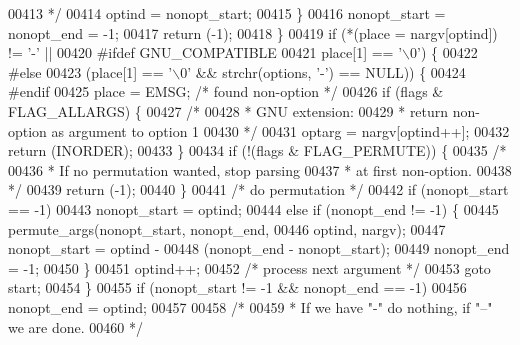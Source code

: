 \begin{DoxyCode}
{{{{{{{{{{{00413 \textcolor{comment}{                 */}
00414                 optind = nonopt\_start;
00415             \}
00416             nonopt\_start = nonopt\_end = -1;
00417             \textcolor{keywordflow}{return} (-1);
00418         \}
00419         \textcolor{keywordflow}{if} (*(place = nargv[optind]) != \textcolor{charliteral}{'-'} ||
00420 #ifdef GNU\_COMPATIBLE
00421             place[1] == \textcolor{charliteral}{'\(\backslash\)0'}) \{
00422 \textcolor{preprocessor}{#else}
00423             (place[1] == \textcolor{charliteral}{'\(\backslash\)0'} && strchr(options, \textcolor{charliteral}{'-'}) == NULL)) \{
00424 \textcolor{preprocessor}{#endif}
00425             place = EMSG;       \textcolor{comment}{/* found non-option */}
00426             \textcolor{keywordflow}{if} (flags & FLAG\_ALLARGS) \{
00427                 \textcolor{comment}{/*}
00428 \textcolor{comment}{                 * GNU extension:}
00429 \textcolor{comment}{                 * return non-option as argument to option 1}
00430 \textcolor{comment}{                 */}
00431                 optarg = nargv[optind++];
00432                 \textcolor{keywordflow}{return} (INORDER);
00433             \}
00434             \textcolor{keywordflow}{if} (!(flags & FLAG\_PERMUTE)) \{
00435                 \textcolor{comment}{/*}
00436 \textcolor{comment}{                 * If no permutation wanted, stop parsing}
00437 \textcolor{comment}{                 * at first non-option.}
00438 \textcolor{comment}{                 */}
00439                 \textcolor{keywordflow}{return} (-1);
00440             \}
00441             \textcolor{comment}{/* do permutation */}
00442             \textcolor{keywordflow}{if} (nonopt\_start == -1)
00443                 nonopt\_start = optind;
00444             \textcolor{keywordflow}{else} \textcolor{keywordflow}{if} (nonopt\_end != -1) \{
00445                 permute\_args(nonopt\_start, nonopt\_end,
00446                     optind, nargv);
00447                 nonopt\_start = optind -
00448                     (nonopt\_end - nonopt\_start);
00449                 nonopt\_end = -1;
00450             \}
00451             optind++;
00452             \textcolor{comment}{/* process next argument */}
00453             \textcolor{keywordflow}{goto} start;
00454         \}
00455         \textcolor{keywordflow}{if} (nonopt\_start != -1 && nonopt\_end == -1)
00456             nonopt\_end = optind;
00457 
00458         \textcolor{comment}{/*}
00459 \textcolor{comment}{         * If we have "-" do nothing, if "--" we are done.}
00460 \textcolor{comment}{         */}
}}}}}}}}}}}
\end{DoxyCode}
